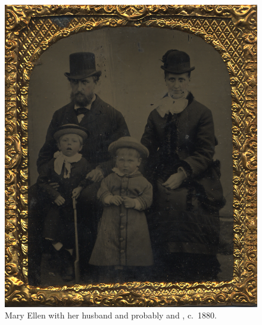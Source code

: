 \begin{figure}
 \centering
 \includegraphics{photos/TH_Barker_with_Mary_Ellen_and_two_children.png}
 \caption{Mary Ellen with her husband and probably  and , c.~1880.}
\end{figure}
